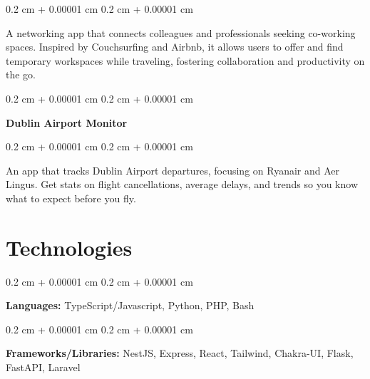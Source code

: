\documentclass[10pt, letterpaper]{article}
\newenvironment{onecolentry}{
    \begin{adjustwidth}{
        0.2 cm + 0.00001 cm
    }{
        0.2 cm + 0.00001 cm
    }
}{
    \end{adjustwidth}
} %
\newenvironment{twocolentry}[2][]{
    \onecolentry
    \def\secondColumn{#2}
    \setcolumnwidth{\fill, 4.5 cm}
    \begin{paracol}{2}
}{
    \switchcolumn \raggedleft \secondColumn
    \end{paracol}
    \endonecolentry
} %
\let\hrefWithoutArrow\href
\renewcommand{\href}[2]{\hrefWithoutArrow{#1}{\ifthenelse{\equal{#2}{}}{ }{#2 }\raisebox{.15ex}{\footnotesize \faExternalLink*}}}
\begin{document}
        \vspace{0.10 cm}
        \begin{onecolentry}

            A networking app that connects colleagues and professionals seeking co-working spaces. Inspired by Couchsurfing and Airbnb, it allows users to offer and find temporary workspaces while traveling, fostering collaboration and productivity on the go.
            
        \end{onecolentry}


        \vspace{0.2 cm}

        \begin{twocolentry}{
            
        
        \textit{\href{https://javieroc.github.io/dublin-airport-monitor/}{github}}}
            \textbf{Dublin Airport Monitor}
        \end{twocolentry}

        \vspace{0.10 cm}
        \begin{onecolentry}
            An app that tracks Dublin Airport departures, focusing on Ryanair and Aer Lingus. Get stats on flight cancellations, average delays, and trends so you know what to expect before you fly.
        \end{onecolentry}


        \vspace{0.2 cm}



    
    \section{Technologies}



        
        \begin{onecolentry}
            \textbf{Languages:} TypeScript/Javascript, Python, PHP, Bash
        \end{onecolentry}

        \vspace{0.2 cm}

        \begin{onecolentry}
            \textbf{Frameworks/Libraries:} NestJS, Express, React, Tailwind, Chakra-UI, Flask, FastAPI, Laravel
        \end{onecolentry}

        \vspace{0.2 cm}
        
\end{document}
